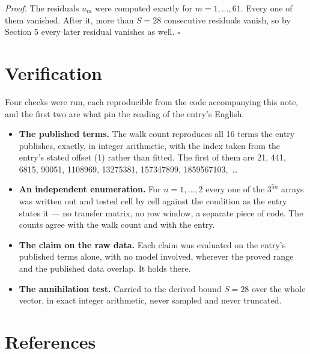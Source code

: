 \documentclass[11pt]{article}
\theoremstyle{definition}
\begin{document}
{\itshape Proof.} The residuals $u_m$ were computed exactly for $m = 1,\dots,61$. Every one of them vanished. After it, more than $S = 28$ consecutive residuals vanish, so by Section 5 every later residual vanishes as well. $\square$

\section{Verification}

Four checks were run, each reproducible from the code accompanying this note, and the first two are what pin the reading of the entry's English.

\begin{itemize}

\item {\bfseries The published terms.} The walk count reproduces all 16 terms the entry publishes, exactly, in integer arithmetic, with the index taken from the entry's stated offset (1) rather than fitted. The first of them are 21, 441, 6815, 90051, 1108969, 13275381, 157347899, 1859567103,~\dots

\item {\bfseries An independent enumeration.} For $n = 1,\dots,2$ every one of the $3^{5n}$ arrays was written out and tested cell by cell against the condition as the entry states it --- no transfer matrix, no row window, a separate piece of code. The counts agree with the walk count and with the entry.

\item {\bfseries The claim on the raw data.} Each claim was evaluated on the entry's published terms alone, with no model involved, wherever the proved range and the published data overlap. It holds there.

\item {\bfseries The annihilation test.} Carried to the derived bound $S = 28$ over the whole vector, in exact integer arithmetic, never sampled and never truncated.

\end{itemize}

\section{References}
\end{document}
